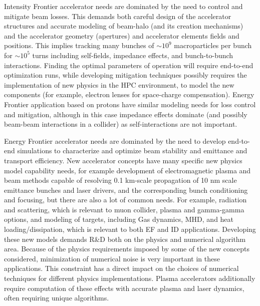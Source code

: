 Intensity Frontier accelerator needs are dominated by the need to
control and mitigate beam losses.  This demands both careful
design of the accelerator structures and accurate modeling of
beam-halo (and its creation mechanisms) and the accelerator
geometry (apertures) and accelerator elements fields and
positions.  This implies tracking many bunches of $\sim 10^9$
macroparticles per bunch for $\sim 10^5$ turns including
self-fields, impedance effects, and bunch-to-bunch interactions.
Finding the optimal parameters of operation will require
end-to-end  optimization runs, while developing mitigation
techniques possibly requires the implementation of new physics in the HPC
environment, to model the new components (for example, electron
lenses for space-charge compensation). Energy Frontier
application based on protons have similar modeling needs for loss
control and mitigation, although in this case impedance effects
dominate (and possibly beam-beam interactions in a collider) as
self-interactions are not important.

Energy Frontier accelerator needs are dominated by the need to
develop end-to-end simulations to characterize and optimize beam
stability and emittance and transport efficiency.  New
accelerator concepts have many specific new physics model
capability needs, for example development of electromagnetic
plasma and beam methods capable of resolving 0.1 km-scale
propagation of 10 nm scale emittance bunches and laser drivers,
and the corresponding bunch conditioning and focusing, but there
are also a lot of common needs.  For example, radiation and
scattering, which is relevant to muon collider, plasma and
gamma-gamma options, and modeling of targets,  including Gas
dynamics, MHD, and heat loading/dissipation,  which is relevant
to both EF and ID applications.  Developing these new models
demands R\&D both on the physics and numerical algorithm area.
Because of the physics requirements imposed by some of the new
concepts considered, minimization of numerical noise is very
important in these applications.  This constraint has a direct
impact on the choices of numerical techniques for different
physics implementations.  Plasma accelerators additionally require 
computation of these effects with accurate plasma and laser dynamics,
 often requiring unique algorithms.

